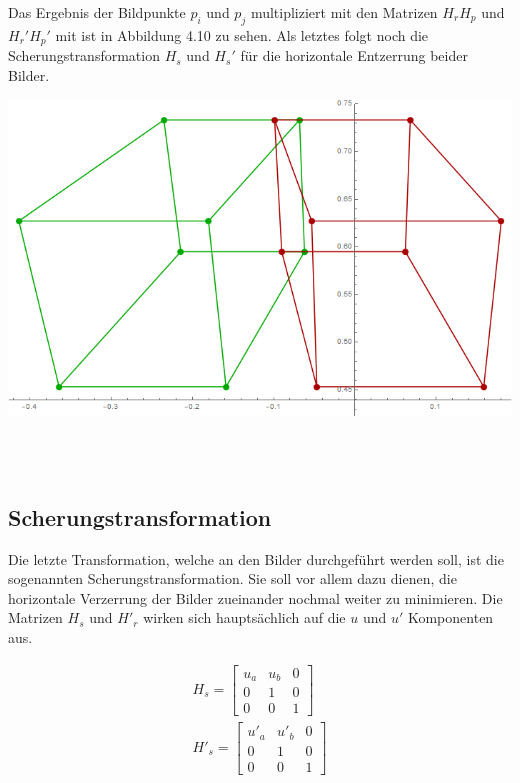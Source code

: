Das Ergebnis der Bildpunkte $p_i$ und $p_j$ multipliziert mit den Matrizen $H_rH_p$ und $H_r'H_p'$ mit ist in Abbildung 4.10 zu sehen. Als letztes folgt noch die Scherungstransformation $H_s$ und $H_s'$ für die horizontale Entzerrung beider Bilder.\\ 

\begin{minipage}{\linewidth}
	\centering
	\includegraphics[width=1.\linewidth]{images/Rectification_HrHp_same_Solutions.png}
\end{minipage}\\ \\

\subsection{Scherungstransformation}

Die letzte Transformation, welche an den Bilder durchgeführt werden soll, ist die sogenannten Scherungstransformation. Sie soll vor allem dazu dienen, die horizontale Verzerrung der Bilder zueinander nochmal weiter zu minimieren. Die Matrizen $H_s$ und $H'_r$ wirken sich hauptsächlich auf die $u$ und $u'$ Komponenten aus. 

\begin{gather}
	H_s =\begin{bmatrix}
	u_a&u_b&0\\
	0&1&0\\
	0&0&1
	\end{bmatrix}\\
		H'_s =\begin{bmatrix}
	u'_a&u'_b&0\\
	0&1&0\\
	0&0&1
	\end{bmatrix}
\end{gather}

